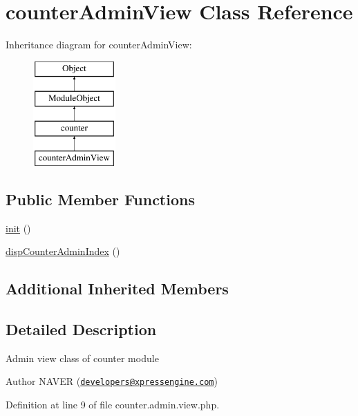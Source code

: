 \hypertarget{classcounterAdminView}{}\section{counter\+Admin\+View Class Reference}
\label{classcounterAdminView}
Inheritance diagram for counter\+Admin\+View\+:\begin{figure}[H]
\begin{center}
\leavevmode
\includegraphics[height=4.000000cm]{classcounterAdminView}
\end{center}
\end{figure}
\subsection*{Public Member Functions}
\begin{DoxyCompactItemize}
\item 
\hyperlink{classcounterAdminView_af681921cbd5c264feb82469ae49195af}{init} ()
\item 
\hyperlink{classcounterAdminView_a029f646bdb62ed58543428face01dfd9}{disp\+Counter\+Admin\+Index} ()
\end{DoxyCompactItemize}
\subsection*{Additional Inherited Members}


\subsection{Detailed Description}
Admin view class of counter module

\begin{DoxyAuthor}{Author}
N\+A\+V\+ER (\href{mailto:developers@xpressengine.com}{\tt developers@xpressengine.\+com}) 
\end{DoxyAuthor}


Definition at line 9 of file counter.\+admin.\+view.\+php.



